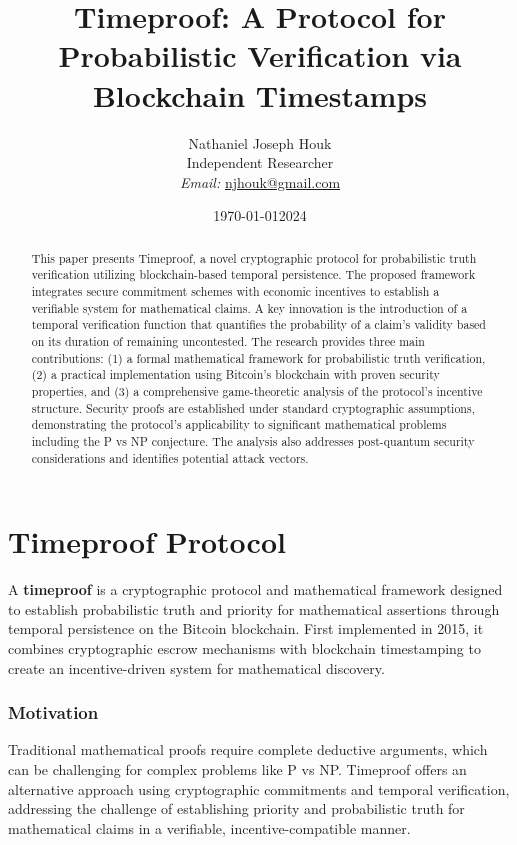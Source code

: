 \documentclass[12pt]{report}
\date{\today}
\begin{document}
\title{Timeproof: A Protocol for Probabilistic Verification via Blockchain Timestamps}
\author{Nathaniel Joseph Houk\\
Independent Researcher\\
\textit{Email:} \href{mailto:njhouk@gmail.com}{njhouk@gmail.com}}
\date{2024}

\maketitle

\begin{abstract}
This paper presents Timeproof, a novel cryptographic protocol for probabilistic truth verification utilizing blockchain-based temporal persistence. The proposed framework integrates secure commitment schemes with economic incentives to establish a verifiable system for mathematical claims. A key innovation is the introduction of a temporal verification function that quantifies the probability of a claim's validity based on its duration of remaining uncontested. The research provides three main contributions: (1) a formal mathematical framework for probabilistic truth verification, (2) a practical implementation using Bitcoin's blockchain with proven security properties, and (3) a comprehensive game-theoretic analysis of the protocol's incentive structure. Security proofs are established under standard cryptographic assumptions, demonstrating the protocol's applicability to significant mathematical problems including the P vs NP conjecture. The analysis also addresses post-quantum security considerations and identifies potential attack vectors.
\end{abstract}

\chapter{Timeproof Protocol}

A \textbf{timeproof} is a cryptographic protocol and mathematical framework designed to establish probabilistic truth and priority for mathematical assertions through temporal persistence on the Bitcoin blockchain. First implemented in 2015, it combines cryptographic escrow mechanisms with blockchain timestamping to create an incentive-driven system for mathematical discovery.

\subsection{Motivation}
Traditional mathematical proofs require complete deductive arguments, which can be challenging for complex problems like P vs NP. Timeproof offers an alternative approach using cryptographic commitments and temporal verification, addressing the challenge of establishing priority and probabilistic truth for mathematical claims in a verifiable, incentive-compatible manner.
\end{document}
